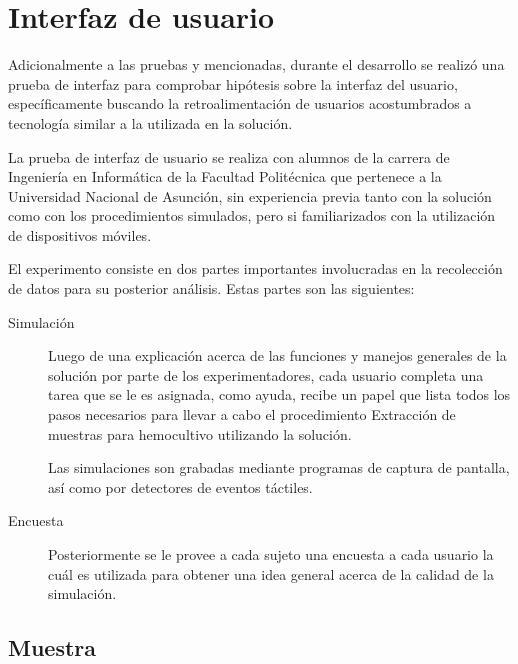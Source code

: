 \section{Interfaz de usuario}
\label{sec:interfaz}


Adicionalmente a las pruebas y mencionadas, durante el desarrollo se realizó una
prueba de interfaz para comprobar hipótesis sobre la interfaz del usuario,
específicamente buscando la retroalimentación de usuarios acostumbrados a
tecnología similar a la utilizada en la solución.

La prueba de interfaz de usuario se realiza con alumnos de la carrera de
Ingeniería en Informática de la Facultad Politécnica que pertenece a la
Universidad Nacional de Asunción, sin experiencia
previa tanto con la solución como con los procedimientos simulados, pero si
familiarizados con la utilización de dispositivos móviles.

El experimento consiste en dos partes importantes involucradas en la recolección
de datos para su posterior análisis. Estas partes son las siguientes:

\begin{description}

\item[Simulación] Luego de una explicación acerca de las funciones y manejos
    generales de la solución por parte de los experimentadores, cada usuario
    completa una tarea que se le es asignada, como ayuda, recibe un papel que
    lista todos los pasos necesarios para llevar a cabo el procedimiento
    Extracción de muestras para hemocultivo utilizando la solución.
    	
    Las simulaciones son grabadas mediante programas de captura de pantalla, así
    como por detectores de eventos táctiles.
    	
\item[Encuesta] Posteriormente se le provee a cada sujeto una encuesta a cada
    usuario la cuál es utilizada para obtener una idea general acerca de la
    calidad de la simulación. 

\end{description} 

\subsection{Muestra}

